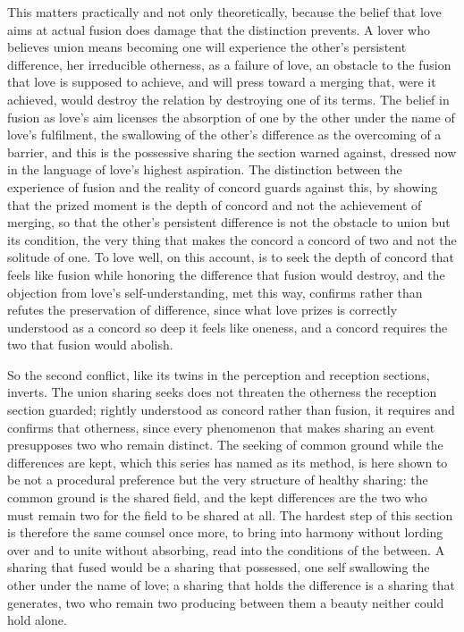 This matters practically and not only theoretically, because the belief that love aims at actual fusion does damage that the distinction prevents. A lover who believes union means becoming one will experience the other's persistent difference, her irreducible otherness, as a failure of love, an obstacle to the fusion that love is supposed to achieve, and will press toward a merging that, were it achieved, would destroy the relation by destroying one of its terms. The belief in fusion as love's aim licenses the absorption of one by the other under the name of love's fulfilment, the swallowing of the other's difference as the overcoming of a barrier, and this is the possessive sharing the section warned against, dressed now in the language of love's highest aspiration. The distinction between the experience of fusion and the reality of concord guards against this, by showing that the prized moment is the depth of concord and not the achievement of merging, so that the other's persistent difference is not the obstacle to union but its condition, the very thing that makes the concord a concord of two and not the solitude of one. To love well, on this account, is to seek the depth of concord that feels like fusion while honoring the difference that fusion would destroy, and the objection from love's self-understanding, met this way, confirms rather than refutes the preservation of difference, since what love prizes is correctly understood as a concord so deep it feels like oneness, and a concord requires the two that fusion would abolish.

So the second conflict, like its twins in the perception and reception sections, inverts. The union sharing seeks does not threaten the otherness the reception section guarded; rightly understood as concord rather than fusion, it requires and confirms that otherness, since every phenomenon that makes sharing an event presupposes two who remain distinct. The seeking of common ground while the differences are kept, which this series has named as its method, is here shown to be not a procedural preference but the very structure of healthy sharing: the common ground is the shared field, and the kept differences are the two who must remain two for the field to be shared at all. The hardest step of this section is therefore the same counsel once more, to bring into harmony without lording over and to unite without absorbing, read into the conditions of the between. A sharing that fused would be a sharing that possessed, one self swallowing the other under the name of love; a sharing that holds the difference is a sharing that generates, two who remain two producing between them a beauty neither could hold alone.

